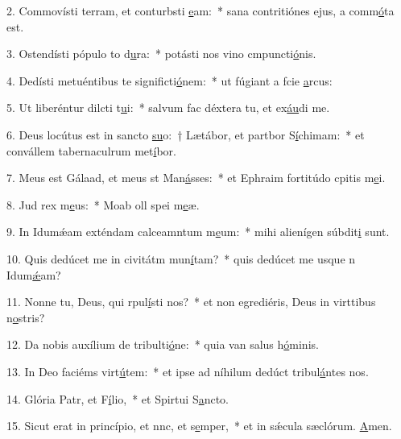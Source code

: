 2. Commovísti terram, et conturbsti \uline{e}am:~* sana contritiónes ejus, a comm\uline{ó}ta est.\par 
3. Ostendísti pópulo to d\uline{u}ra:~* potásti nos vino cmpuncti\uline{ó}nis.\par 
4. Dedísti metuéntibus te significti\uline{ó}nem:~* ut fúgiant a fcie \uline{a}rcus:\par 
5. Ut liberéntur dilcti t\uline{u}i:~* salvum fac déxtera tu, et ex\uline{áu}di me.\par 
6. Deus locútus est in sancto \uline{su}o:~† Lætábor, et partbor S\uline{í}chimam:~* et convállem tabernaculrum met\uline{í}bor.\par 
7. Meus est Gálaad, et meus st Man\uline{á}sses:~* et Ephraim fortitúdo cpitis m\uline{e}i.\par 
8. Jud rex m\uline{e}us:~* Moab oll spei m\uline{e}æ.\par 
9. In Idumǽam exténdam calceamntum m\uline{e}um:~* mihi alienígen súbdit\uline{i} sunt.\par 
10. Quis dedúcet me in civitátm mun\uline{í}tam?~* quis dedúcet me usque n Idum\uline{ǽ}am?\par 
11. Nonne tu, Deus, qui rpul\uline{í}sti nos?~* et non egrediéris, Deus in virttibus n\uline{o}stris?\par 
12. Da nobis auxílium de tribulti\uline{ó}ne:~* quia van salus h\uline{ó}minis.\par 
13. In Deo faciéms virt\uline{ú}tem:~* et ipse ad níhilum dedúct tribul\uline{á}ntes nos.\par 
14. Glória Patr, et F\uline{í}lio,~* et Spirtui S\uline{a}ncto.\par 
15. Sicut erat in princípio, et nnc, et s\uline{e}mper,~* et in sǽcula sæclórum. \uline{A}men.\par 
